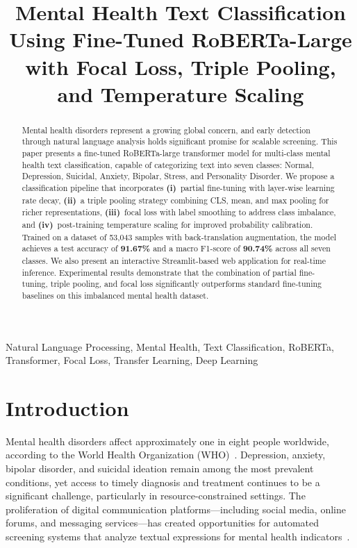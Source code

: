 \documentclass[conference, 10pt]{IEEEtran}
\title{Mental Health Text Classification Using Fine-Tuned RoBERTa-Large\\with Focal Loss, Triple Pooling, and Temperature Scaling}
\author{
    \IEEEauthorblockN{Your Name Here}
    \IEEEauthorblockA{
        Department of Computer Science\\
        Your University Name\\
        City, Country\\
        email@example.com
    }
}
\begin{document}
\maketitle

\begin{abstract}
Mental health disorders represent a growing global concern, and early detection through natural language analysis holds significant promise for scalable screening. This paper presents a fine-tuned RoBERTa-large transformer model for multi-class mental health text classification, capable of categorizing text into seven classes: Normal, Depression, Suicidal, Anxiety, Bipolar, Stress, and Personality Disorder. We propose a classification pipeline that incorporates \textbf{(i)}~partial fine-tuning with layer-wise learning rate decay, \textbf{(ii)}~a triple pooling strategy combining CLS, mean, and max pooling for richer representations, \textbf{(iii)}~focal loss with label smoothing to address class imbalance, and \textbf{(iv)}~post-training temperature scaling for improved probability calibration. Trained on a dataset of 53,043 samples with back-translation augmentation, the model achieves a test accuracy of \textbf{91.67\%} and a macro F1-score of \textbf{90.74\%} across all seven classes. We also present an interactive Streamlit-based web application for real-time inference. Experimental results demonstrate that the combination of partial fine-tuning, triple pooling, and focal loss significantly outperforms standard fine-tuning baselines on this imbalanced mental health dataset.
\end{abstract}

\begin{IEEEkeywords}
Natural Language Processing, Mental Health, Text Classification, RoBERTa, Transformer, Focal Loss, Transfer Learning, Deep Learning
\end{IEEEkeywords}

\section{Introduction}

Mental health disorders affect approximately one in eight people worldwide, according to the World Health Organization (WHO)~\cite{who2022}. Depression, anxiety, bipolar disorder, and suicidal ideation remain among the most prevalent conditions, yet access to timely diagnosis and treatment continues to be a significant challenge, particularly in resource-constrained settings. The proliferation of digital communication platforms—including social media, online forums, and messaging services—has created opportunities for automated screening systems that analyze textual expressions for mental health indicators~\cite{calvo2017natural}.
\end{document}
